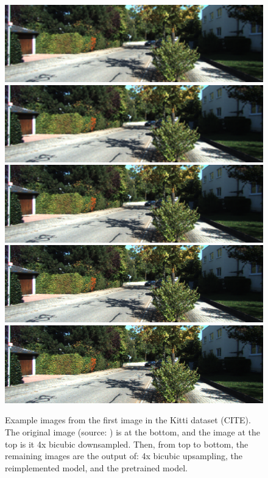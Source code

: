\documentclass{article}
\begin{document}
    \begin{figure}
        \centering
        \includegraphics[width=\textwidth]{test_output/nearest kitti.png}
        \includegraphics[width=\textwidth]{test_output/bicubic kitti.png}
        \includegraphics[width=\textwidth]{test_output/model kitti.png}
        \includegraphics[width=\textwidth]{test_output/pretrained kitti.png}
        \includegraphics[width=\textwidth]{test_data/kitti.png}
        \caption{Example images from the first image in the Kitti dataset (CITE). The original image (source: \citet{Geiger2012CVPR}) is at the bottom, and the image at the top is it 4x bicubic downsampled. Then, from top to bottom, the remaining images are the output of: 4x bicubic upsampling, the reimplemented model, and the pretrained model.} \label{example output kitti}
    \end{figure}
\end{document}
